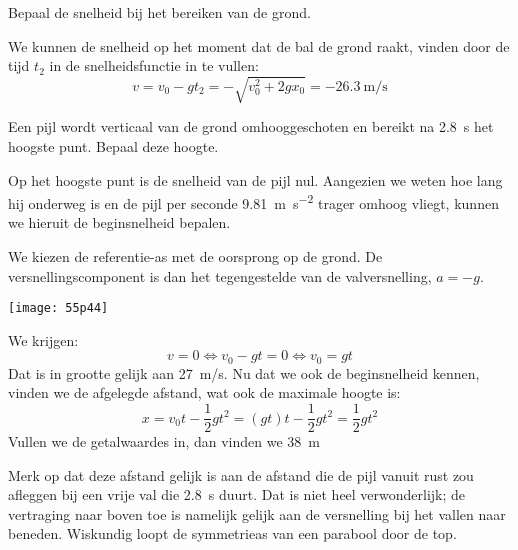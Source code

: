 \documentclass{ximera}
\begin{document}
\begin{exercise}
    \begin{question} 
        Bepaal de snelheid bij het bereiken van de grond.          
        \begin{oplossing} 
            We kunnen de snelheid op het moment dat de bal de grond raakt, vinden door de tijd \(t_2\) in de snelheidsfunctie in te vullen:
            \[
            v = v_0 - g t_2 = -\sqrt{v_0^2 + 2 g x_0} = \SI{-26,3}{\meter\per\second}
            \]
        \end{oplossing} 
    \end{question}
\end{exercise}

\begin{exercise}
    Een pijl wordt verticaal van de grond omhooggeschoten en bereikt na \SI{2,8}{s} het hoogste punt. Bepaal deze hoogte.
    \begin{oplossing}
        Op het hoogste punt is de snelheid van de pijl nul. Aangezien we weten hoe lang hij onderweg is en de pijl per seconde \SI{9,81}{\meter\per\second\squared} trager omhoog vliegt, kunnen we hieruit de beginsnelheid bepalen. 
        
        We kiezen de referentie-as met de oorsprong op de grond. De versnellingscomponent is dan het tegengestelde van de valversnelling, $a=-g$.
        \begin{image}
            \texttt{[image: 55p44]}
        \end{image}
        We krijgen:
        \begin{equation*}
            v=0\Leftrightarrow v_0-gt=0\Leftrightarrow v_0=gt
        \end{equation*}
        Dat is in grootte gelijk aan \SI{27}{m/s}. Nu dat we ook de beginsnelheid kennen, vinden we de afgelegde afstand, wat ook de maximale hoogte is:
        \begin{equation*}
            x=v_0t-\frac{1}{2}gt^2=(gt)t-\frac{1}{2}gt^2=\frac{1}{2}gt^2
        \end{equation*}
        Vullen we de getalwaardes in, dan vinden we \SI{38}{m}

        Merk op dat deze afstand gelijk is aan de afstand die de pijl vanuit rust zou afleggen bij een vrije val die \SI{2,8}{s} duurt. Dat is niet heel verwonderlijk; de vertraging naar boven toe is namelijk gelijk aan de versnelling bij het vallen naar beneden. Wiskundig loopt de symmetrieas van een parabool door de top. 
    \end{oplossing}
\end{exercise}
\end{document}
